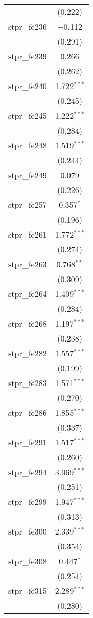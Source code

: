 \begin{table}[!htbp]
\begin{tabular}{@{\extracolsep{5pt}}lc}
  & (0.222) \\ 
  stpr\_fe236 & $-$0.112 \\ 
  & (0.291) \\ 
  stpr\_fe239 & 0.266 \\ 
  & (0.262) \\ 
  stpr\_fe240 & 1.722$^{***}$ \\ 
  & (0.245) \\ 
  stpr\_fe245 & 1.222$^{***}$ \\ 
  & (0.284) \\ 
  stpr\_fe248 & 1.519$^{***}$ \\ 
  & (0.244) \\ 
  stpr\_fe249 & 0.079 \\ 
  & (0.226) \\ 
  stpr\_fe257 & 0.357$^{*}$ \\ 
  & (0.196) \\ 
  stpr\_fe261 & 1.772$^{***}$ \\ 
  & (0.274) \\ 
  stpr\_fe263 & 0.768$^{**}$ \\ 
  & (0.309) \\ 
  stpr\_fe264 & 1.409$^{***}$ \\ 
  & (0.284) \\ 
  stpr\_fe268 & 1.197$^{***}$ \\ 
  & (0.238) \\ 
  stpr\_fe282 & 1.557$^{***}$ \\ 
  & (0.199) \\ 
  stpr\_fe283 & 1.571$^{***}$ \\ 
  & (0.270) \\ 
  stpr\_fe286 & 1.855$^{***}$ \\ 
  & (0.337) \\ 
  stpr\_fe291 & 1.517$^{***}$ \\ 
  & (0.260) \\ 
  stpr\_fe294 & 3.069$^{***}$ \\ 
  & (0.251) \\ 
  stpr\_fe299 & 1.947$^{***}$ \\ 
  & (0.313) \\ 
  stpr\_fe300 & 2.339$^{***}$ \\ 
  & (0.354) \\ 
  stpr\_fe308 & 0.447$^{*}$ \\ 
  & (0.254) \\ 
  stpr\_fe315 & 2.289$^{***}$ \\ 
  & (0.280) \\ 

\end{tabular}
\end{table}
